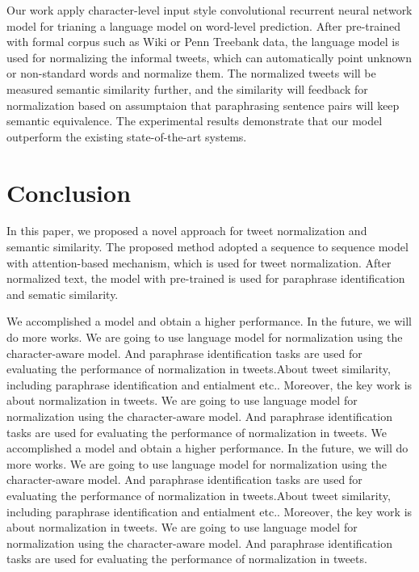 \documentclass[letterpaper]{article}
\begin{document}
Our work apply character-level input style convolutional recurrent neural network model for trianing a language model on word-level prediction. After pre-trained with formal corpus such as Wiki or Penn Treebank data, the language model is used for normalizing the informal tweets, which can automatically point unknown or non-standard words and normalize them. The normalized tweets will be measured semantic similarity further, and the similarity will feedback for normalization based on assumptaion that paraphrasing sentence pairs will keep semantic equivalence. The experimental results demonstrate that our model outperform the existing state-of-the-art systems.

\section{Conclusion}
In this paper, we proposed a novel approach for tweet normalization and semantic similarity. The proposed method adopted a sequence to sequence model with attention-based mechanism, which is used for tweet normalization. After normalized text, the model with pre-trained is used for paraphrase identification and sematic similarity.

We accomplished a model and obtain a higher performance. In the future, we will do more works. We are going to use language model for normalization using the character-aware model. And paraphrase identification tasks are used for evaluating the performance of normalization in tweets.About tweet similarity, including paraphrase identification and entialment etc.. Moreover, the key work is about normalization in tweets. We are going to use language model for normalization using the character-aware model. And paraphrase identification tasks are used for evaluating the performance of normalization in tweets. We accomplished a model and obtain a higher performance. In the future, we will do more works. We are going to use language model for normalization using the character-aware model. And paraphrase identification tasks are used for evaluating the performance of normalization in tweets.About tweet similarity, including paraphrase identification and entialment etc.. Moreover, the key work is about normalization in tweets. We are going to use language model for normalization using the character-aware model. And paraphrase identification tasks are used for evaluating the performance of normalization in tweets.



\end{document}
